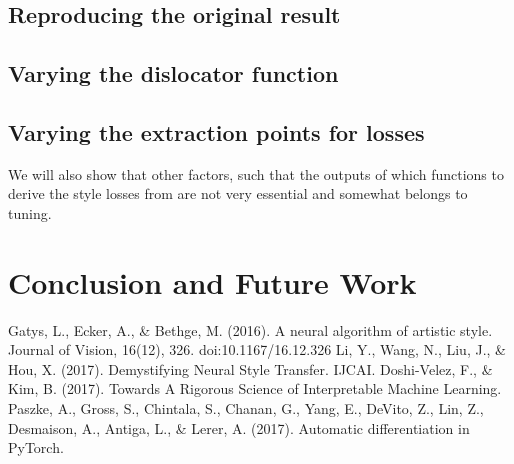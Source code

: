 \documentclass[runningheads]{llncs}
\begin{document}
\subsection{Reproducing the original result}

\subsection{Varying the dislocator function}

\subsection{Varying the extraction points for losses}

We will also show that other factors, such that the outputs of which functions to derive the style 
losses from are not very essential and somewhat belongs to tuning.

\section{Conclusion and Future Work}

\begin{thebibliography}{8}
Gatys, L., Ecker, A., \& Bethge, M. (2016). A neural algorithm of artistic style. Journal of Vision, 16(12), 326. doi:10.1167/16.12.326
Li, Y., Wang, N., Liu, J., \& Hou, X. (2017). Demystifying Neural Style Transfer. IJCAI.
Doshi-Velez, F., \& Kim, B. (2017). Towards A Rigorous Science of Interpretable Machine Learning.
Paszke, A., Gross, S., Chintala, S., Chanan, G., Yang, E., DeVito, Z., Lin, Z., Desmaison, A., Antiga, L., \& Lerer, A. (2017). Automatic differentiation in PyTorch.
\end{thebibliography}
\end{document}
